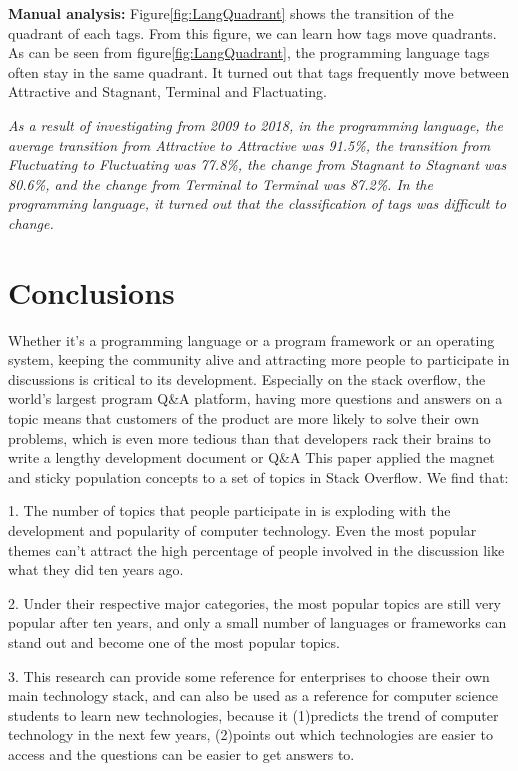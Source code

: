 \documentclass[conference]{IEEEtran}
\begin{document}
\textbf{Manual analysis:}
Figure\ref{fig:LangQuadrant} shows the transition of the quadrant of each tags. From this figure, we can learn how tags move quadrants.
As can be seen from figure\ref{fig:LangQuadrant}, the programming language tags often stay in the same quadrant. It turned out that tags frequently move between Attractive and Stagnant, Terminal and Flactuating.
\smallskip\smallskip

\begin{oframed}
\emph{As a result of investigating from 2009 to 2018, in the programming language, the average transition from Attractive to Attractive was 91.5\%, the transition from Fluctuating to Fluctuating was 77.8\%, the change from Stagnant to Stagnant was 80.6\%, and the change from Terminal to Terminal was 87.2\%.  In the programming language, it turned out that the classification of tags was difficult to change.}
\end{oframed}

\section{Conclusions}

Whether it's a programming language or a program framework or an operating system, keeping the community alive and attracting more people to participate in discussions is critical to its development. Especially on the stack overflow, the world's largest program Q\&A platform, having more questions and answers on a topic means that customers of the product are more likely to solve their own problems, which is even more tedious than that developers rack their brains to write a lengthy development document or Q\&A This paper applied the magnet and sticky population concepts to a set of topics in Stack Overflow. We find that:

1. The number of topics that people participate in is exploding with the development and popularity of computer technology. Even the most popular themes can't attract the high percentage of people involved in the discussion like what they did ten years ago.
\smallskip\smallskip

2. Under their respective major categories, the most popular topics are still very popular after ten years, and only a small number of languages or frameworks can stand out and become one of the most popular topics.
\smallskip\smallskip

3. This research can provide some reference for enterprises to choose their own main technology stack, and can also be used as a reference for computer science students to learn new technologies, because it (1)predicts the trend of computer technology in the next few years, (2)points out which technologies are easier to access and the questions can be easier to get answers to.\\
\end{document}

